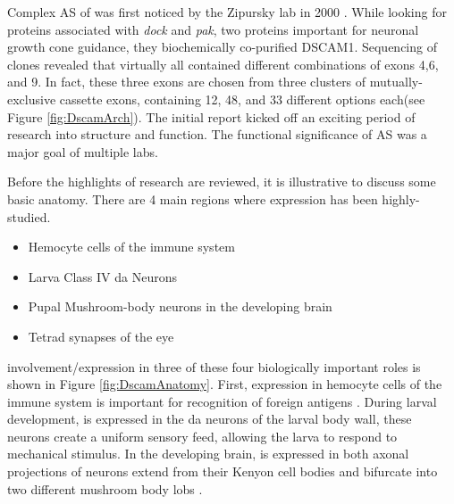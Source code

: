 Complex AS of\dscam{} was first noticed by the Zipursky lab in 2000 \citep{Schmucker2000}. While looking for proteins associated with \textit{dock} and \textit{pak}, two proteins important for neuronal growth cone guidance, they biochemically co-purified DSCAM1. Sequencing of \dscam{} clones revealed that virtually all contained different combinations of exons 4,6, and 9. In fact, these three exons are chosen from three clusters of mutually-exclusive cassette exons, containing 12, 48, and 33 different options each(see Figure \ref{fig:DscamArch}). The initial report kicked off an exciting period of research into \dscam{} structure and function. The functional significance of \dscam{} AS was a major goal of multiple labs.

Before the highlights of \dscam{} research are reviewed, it is illustrative to discuss some basic \flies{} anatomy. There are 4 main regions where \dscam{} expression has been highly-studied.

\begin{itemize} \itemsep0.5pt \parskip0pt 
  \item Hemocyte cells of the immune system
  \item Larva Class IV da Neurons 
  \item Pupal Mushroom-body neurons in the developing brain
  \item Tetrad synapses of the eye
\end{itemize}

\dscam{} involvement/expression in three of these four  biologically important roles is shown in Figure \ref{fig:DscamAnatomy}. First, \dscam{} expression in hemocyte cells of the immune system is important for recognition of foreign antigens \citep{Watson2005}. During larval development, \dscam{} is expressed in the da neurons of the larval body wall, these neurons create a uniform sensory feed, allowing the larva to respond to mechanical stimulus. In the developing brain, \dscam{} is expressed in both axonal projections of neurons extend from their Kenyon cell bodies and bifurcate into two different mushroom body lobs \citep{Zhan2004}. 

